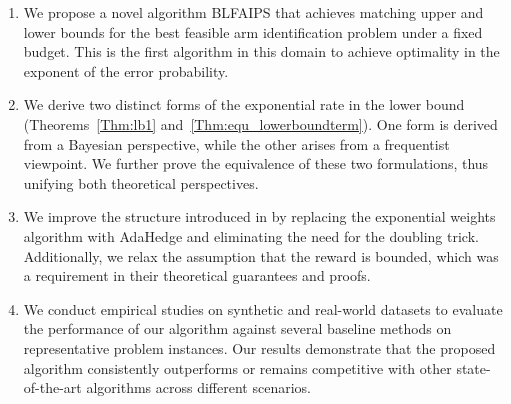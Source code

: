 \documentclass[accepted]{uai2025} %
\theoremstyle{plain}
\theoremstyle{definition}
\theoremstyle{remark}
\begin{document}
\begin{enumerate}
    \item We propose a novel algorithm BLFAIPS that achieves matching upper and lower bounds for the best feasible arm identification problem under a fixed budget. This is the first algorithm in this domain to achieve optimality in the exponent of the error probability.

    \item We derive two distinct forms of the exponential rate in the lower bound (Theorems~\ref{Thm:lb1} and~\ref{Thm:equ_lowerboundterm}). One form is derived from a Bayesian perspective, while the other arises from a frequentist viewpoint. We further prove the equivalence of these two formulations, thus unifying both theoretical perspectives.

    \item We improve the structure introduced in \cite{li2024optimal} by replacing the exponential weights algorithm with AdaHedge and eliminating the need for the doubling trick. Additionally, we relax the assumption that the reward is bounded, which was a requirement in their theoretical guarantees and proofs.

    \item We conduct empirical studies on synthetic and real-world datasets to evaluate the performance of our algorithm against several baseline methods on representative problem instances. Our results demonstrate that the proposed algorithm consistently outperforms or remains competitive with other state-of-the-art algorithms across different scenarios.

    
\end{enumerate}
 
\end{document}
